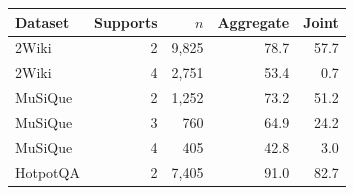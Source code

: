 \documentclass[11pt]{article}
\begin{document}
\begin{center}
\begin{minipage}{\columnwidth}
\small
{}
\label{tab:support-strata}
\centering
\begin{tabular}{@{}lrrrr@{}}
\toprule
\textbf{Dataset} & \textbf{Supports} & $n$ & \textbf{Aggregate} & \textbf{Joint} \\
\midrule
2Wiki & 2 & 9,825 & 78.7 & 57.7 \\
2Wiki & 4 & 2,751 & 53.4 & 0.7 \\
MuSiQue & 2 & 1,252 & 73.2 & 51.2 \\
MuSiQue & 3 & 760 & 64.9 & 24.2 \\
MuSiQue & 4 & 405 & 42.8 & 3.0 \\
HotpotQA & 2 & 7,405 & 91.0 & 82.7 \\
\bottomrule
\end{tabular}
\end{minipage}
\end{center}
\end{document}
